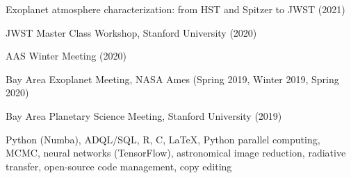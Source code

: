 \documentclass[12pt,letterpaper]{article}
\begin{document}
\begin{list}{}{\cvlist}
\item Exoplanet atmosphere characterization: from HST and Spitzer to JWST (2021)
\item JWST Master Class Workshop, Stanford University (2020)
\item AAS Winter Meeting (2020)
\item Bay Area Exoplanet Meeting, NASA Ames (Spring 2019, Winter 2019, Spring 2020)
\item Bay Area Planetary Science Meeting, Stanford University (2019)
\end{list}

\begin{list}{}{\cvlist}
Python (Numba), ADQL/SQL, R, C, \LaTeX, Python parallel computing, MCMC, neural networks (TensorFlow), astronomical image reduction, radiative transfer, open-source code management, copy editing
\end{list}
\end{document}
